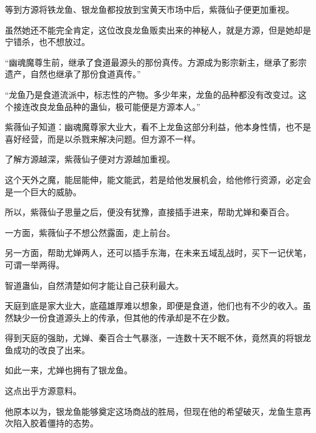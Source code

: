 \begin{this_body}
等到方源将铁龙鱼、银龙鱼都投放到宝黄天市场中后，紫薇仙子便更加重视。

虽然她还不能完全肯定，这位改良龙鱼贩卖出来的神秘人，就是方源，但是她却是宁错杀，也不想放过。

“幽魂魔尊生前，继承了食道最源头的那份真传。方源成为影宗新主，继承了影宗遗产，自然也继承了那份食道真传。”

“龙鱼乃是食道流派中，标志性的产物。多少年来，龙鱼的品种都没有改变过。这个接连改良龙鱼品种的蛊仙，极可能便是方源本人。”

紫薇仙子知道：幽魂魔尊家大业大，看不上龙鱼这部分利益，他本身性情，也不是喜好经营，而是以杀戮来解决问题。但方源不一样。

了解方源越深，紫薇仙子便对方源越加重视。

这个天外之魔，能屈能伸，能文能武，若是给他发展机会，给他修行资源，必定会是一个巨大的威胁。

所以，紫薇仙子思量之后，便没有犹豫，直接插手进来，帮助尤婵和秦百合。

一方面，紫薇仙子不想公然露面，走上前台。

另一方面，帮助尤婵两人，还可以插手东海，在未来五域乱战时，买下一记伏笔，可谓一举两得。

智道蛊仙，自然清楚如何才能让自己获利最大。

天庭到底是家大业大，底蕴雄厚难以想象，即便是食道，他们也有不少的收入。虽然缺少一份食道源头上的传承，但其他的传承却是不在少数。

得到天庭的强助，尤婵、秦百合士气暴涨，一连数十天不眠不休，竟然真的将银龙鱼成功的改良了出来。

如此一来，尤婵也拥有了银龙鱼。

这点出乎方源意料。

他原本以为，银龙鱼能够奠定这场商战的胜局，但现在他的希望破灭，龙鱼生意再次陷入胶着僵持的态势。

\end{this_body}

